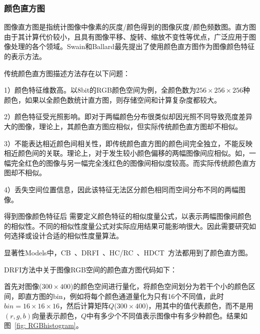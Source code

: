 \documentclass[12pt]{article}
\begin{document}
\subsubsection{颜色直方图}

图像直方图是指统计图像中像素的灰度/颜色得到的图像灰度/颜色频数图。直方图由于其计算代价较小，且具有图像平移、旋转、缩放不变性等优点，广泛应用于图像处理的各个领域。Swain和Ballard最先提出了使用颜色直方图作为图像颜色特征的表示方法。

传统颜色直方图描述方法存在以下问题：

1）颜色特征维数高。以8bit的RGB颜色空间为例，全颜色数为$256 \times 256 \times 256$种颜色，如果以全颜色数统计直方图，则存储空间和计算复杂度都较大。

2）颜色特征受光照影响。即对于两幅颜色分布很类似却因光照不同导致亮度差异大的图像，理论上，其颜色直方图应相似，但实际传统颜色直方图却不相似。

3）不能表达相近颜色间相关性，即传统颜色直方图的颜色间完全独立，不能反映相近颜色间的关联。理论上，对于发生较小颜色偏移的两幅图像间应相似。如，一幅完全红色的图像与另一幅完全浅红色的图像间相似度较高。而实际传统颜色直方图却不相似。

4）丢失空间位置信息，因此该特征无法区分颜色相同而空间分布不同的两幅图像。

得到图像颜色特征后 需要定义颜色特征的相似度量公式，以表示两幅图像间颜色的相似性。不同的相似性度量公式对实际应用结果可能影响很大。因此需要研究如何选择或设计合适的相似性度量算法。

显著性Models中，CB~\cite{jiang2011automatic}、DRFI~\cite{jianghuaizu2013salient}、HC/RC~\cite{cheng2011global}、HDCT~\cite{kim2014salient}方法都用到了颜色直方图。

DRFI方法中关于图像RGB空间的颜色直方图代码如下：



首先对图像($300 \times 400$)的颜色空间进行量化，将颜色空间划分为若干个小的颜色区间，即直方图的bin，例如将每个颜色通道量化为只有16个不同值，此时$bin = 16 \times 16 \times 16$，然后计算矩阵$Q$($300 \times 400$)，用其中的值代表颜色，而不是用$(r, g, b)$向量表示颜色，$Q$中有多少个不同值表示图像中有多少种颜色。结果如图~\ref{fig: RGBhistogram}。
\end{document}
